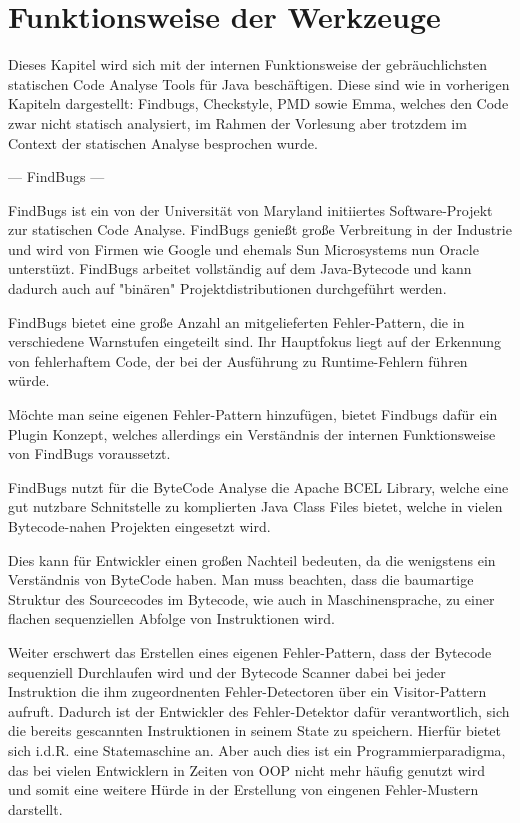\section{Funktionsweise der Werkzeuge}

Dieses Kapitel wird sich mit der internen Funktionsweise der gebräuchlichsten statischen Code Analyse Tools für Java beschäftigen. Diese sind wie in vorherigen Kapiteln dargestellt: Findbugs, Checkstyle, PMD sowie Emma, welches den Code zwar nicht statisch analysiert, im Rahmen der Vorlesung aber trotzdem im Context der statischen Analyse besprochen wurde.


--- FindBugs ---

FindBugs ist ein von der Universität von Maryland initiiertes Software-Projekt zur statischen Code Analyse. FindBugs genießt große Verbreitung in der Industrie und wird von Firmen wie Google und ehemals Sun Microsystems nun Oracle unterstüzt.
FindBugs arbeitet vollständig auf dem Java-Bytecode und kann dadurch auch auf "binären" Projektdistributionen durchgeführt werden. 

FindBugs bietet eine große Anzahl an mitgelieferten Fehler-Pattern, die in verschiedene Warnstufen eingeteilt sind. Ihr Hauptfokus liegt auf der Erkennung von fehlerhaftem Code, der bei der Ausführung zu Runtime-Fehlern führen würde.

Möchte man seine eigenen Fehler-Pattern hinzufügen, bietet Findbugs dafür ein Plugin Konzept, welches allerdings ein Verständnis der internen Funktionsweise von FindBugs voraussetzt.
 
FindBugs nutzt für die ByteCode Analyse die Apache BCEL Library, welche eine gut nutzbare Schnitstelle zu komplierten Java Class Files bietet, welche in vielen Bytecode-nahen Projekten eingesetzt wird.

Dies kann für Entwickler einen großen Nachteil bedeuten, da die wenigstens ein Verständnis von ByteCode haben. Man muss beachten, dass die baumartige Struktur des Sourcecodes im Bytecode, wie auch in Maschinensprache, zu einer flachen sequenziellen Abfolge von Instruktionen wird. 

Weiter erschwert das Erstellen eines eigenen Fehler-Pattern, dass der Bytecode sequenziell Durchlaufen wird und der Bytecode Scanner dabei bei jeder Instruktion die ihm zugeordnenten Fehler-Detectoren über ein Visitor-Pattern aufruft. 
Dadurch ist der Entwickler des Fehler-Detektor dafür verantwortlich, sich die bereits gescannten Instruktionen in seinem State zu speichern. Hierfür bietet sich i.d.R. eine Statemaschine an. Aber auch dies ist ein Programmierparadigma, das bei vielen Entwicklern in Zeiten von OOP nicht mehr häufig genutzt wird und somit eine weitere Hürde in der Erstellung von eingenen Fehler-Mustern darstellt.

